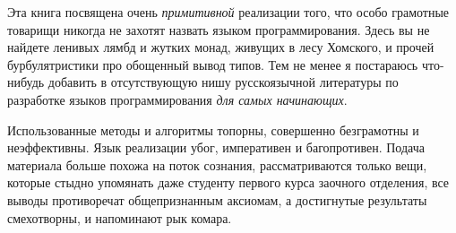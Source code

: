 \clearpage
{}

Эта книга посвящена очень \emph{примитивной} реализации того, что особо
грамотные товарищи никогда не захотят назвать языком программирования. Здесь вы
не найдете ленивых лямбд и жутких монад, живущих в лесу Хомского, и прочей
бурбулятристики про обощенный вывод типов. Тем не менее я постараюсь что-нибудь
добавить в отсутствующую нишу русскоязычной литературы по разработке языков
программирования \emph{для самых начинающих}.

Использованные методы и алгоритмы топорны, совершенно безграмотны и 
неэффективны. Язык реализации убог, императивен и багопротивен. Подача материала
больше похожа на поток сознания, рассматриваются только вещи, которые стыдно
упомянать даже студенту первого курса заочного отделения, все выводы
противоречат общепризнанным аксиомам, а достигнутые результаты смехотворны, и
напоминают рык комара.
